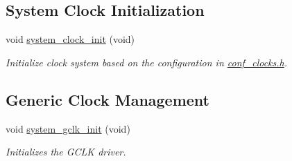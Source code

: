 \subsection*{System Clock Initialization}
\begin{DoxyCompactItemize}
\item 
void \hyperlink{group__asfdoc__sam0__system__clock__group_ga128236c1939f726786521434d8488b37}{system\+\_\+clock\+\_\+init} (void)
\begin{DoxyCompactList}\small\item\em Initialize clock system based on the configuration in \hyperlink{conf__clocks_8h}{conf\+\_\+clocks.\+h}. \end{DoxyCompactList}\end{DoxyCompactItemize}
\subsection*{Generic Clock Management}
\begin{DoxyCompactItemize}
\item 
void \hyperlink{group__asfdoc__sam0__system__clock__group_ga2e73072514e6300d60f18039ca47bf09}{system\+\_\+gclk\+\_\+init} (void)
\begin{DoxyCompactList}\small\item\em Initializes the G\+C\+L\+K driver. \end{DoxyCompactList}\end{DoxyCompactItemize}
